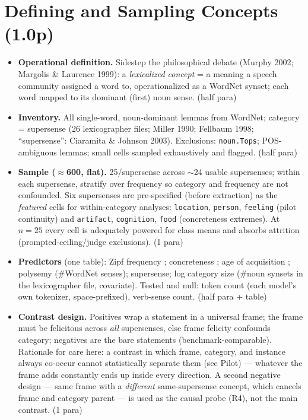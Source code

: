 \documentclass[11pt]{article}
\newenvironment{outline}{\color{gray!70!black}\begin{itemize}[leftmargin=1.2em,itemsep=1pt]}{\end{itemize}\color{black}}
\begin{document}
\section{Defining and Sampling Concepts (1.0p)}
\begin{outline}
\item \textbf{Operational definition.} Sidestep the philosophical debate (Murphy 2002; Margolis \& Laurence 1999): a \emph{lexicalized concept} = a meaning a speech community assigned a word to, operationalized as a WordNet synset; each word mapped to its dominant (first) noun sense. (half para)
\item \textbf{Inventory.} All single-word, noun-dominant lemmas from WordNet; category = supersense (26 lexicographer files; Miller 1990; Fellbaum 1998; ``supersense'': Ciaramita \& Johnson 2003). Exclusions: \texttt{noun.Tops}; POS-ambiguous lemmas; small cells sampled exhaustively and flagged. (half para)
\item \textbf{Sample ($\approx$600, flat).} 25/supersense across $\sim$24 usable supersenses; within each supersense, stratify over frequency so category and frequency are not confounded. Six supersenses are pre-specified (before extraction) as the \emph{featured} cells for within-category analyses: \texttt{location}, \texttt{person}, \texttt{feeling} (pilot continuity) and \texttt{artifact}, \texttt{cognition}, \texttt{food} (concreteness extremes). At $n{=}25$ every cell is adequately powered for class means and absorbs attrition (prompted-ceiling/judge exclusions). (1 para)
\item \textbf{Predictors} (one table): Zipf frequency \citep{speer2018wordfreq}; concreteness \citep{brysbaert2014concreteness}; age of acquisition \citep{kuperman2012aoa}; polysemy (\#WordNet senses); supersense; log category size (\#noun synsets in the lexicographer file, covariate). Tested and null: token count (each model's own tokenizer, space-prefixed), verb-sense count. (half para + table)
\item \textbf{Contrast design.} Positives wrap a statement in a universal frame; the frame must be felicitous across \emph{all} supersenses, else frame felicity confounds category; negatives are the bare statements (benchmark-comparable). Rationale for care here: a contrast in which frame, category, and instance always co-occur cannot statistically separate them (see Pilot) --- whatever the frame adds constantly ends up inside every direction. A second negative design --- same frame with a \emph{different} same-supersense concept, which cancels frame and category parent --- is used as the causal probe (R4), not the main contrast. (1 para)

\end{outline}
\end{document}
